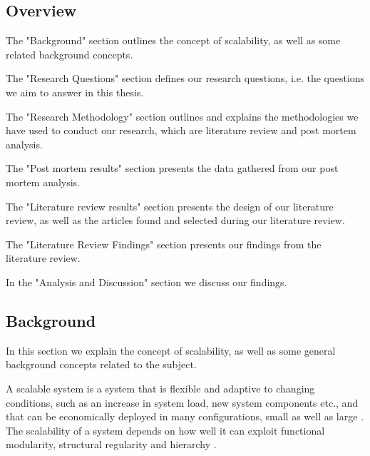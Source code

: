 \documentclass{article}
\begin{document}
{\subsection{Overview}

The "Background" section outlines the concept of scalability, as well as some
related background concepts.

The "Research Questions" section defines our research questions, i.e. the
questions we aim to answer in this thesis.

The "Research Methodology" section outlines and explains the methodologies we
have used to conduct our research, which are literature review and post mortem
analysis.

The "Post mortem results" section presents the data gathered from our post
mortem analysis.

The "Literature review results" section presents the design of our literature
review, as well as the articles found and selected during our literature
review.

The "Literature Review Findings" section presents our findings from the
literature review.  

In the "Analysis and Discussion" section we discuss our
findings.

\subsection{Background}

In this section we explain the concept of scalability, as well as some general
background concepts related to the subject.

A scalable system is a system that is flexible and adaptive to changing
conditions, such as an increase in system load, new system components etc., and
that can be economically deployed in many configurations, small as well as
large \cite{jogalekar2000evaluating}. The scalability of a system depends on
how well it can exploit functional modularity, structural regularity and
hierarchy \cite{lipson2007principles}.

}
\end{document}
